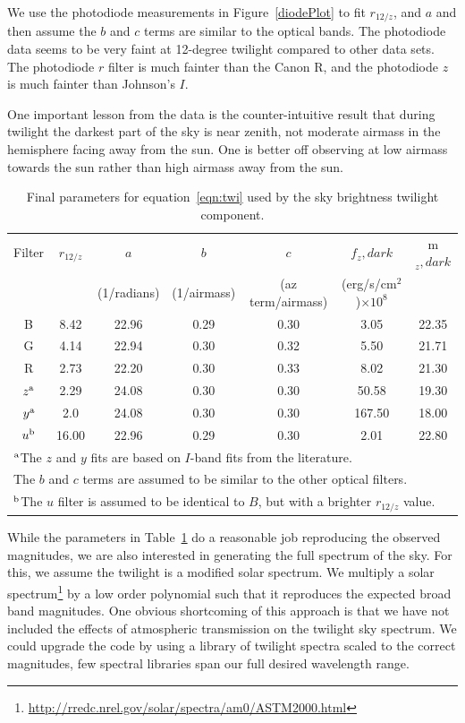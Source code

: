 \documentclass[]{spie}
\begin{document}
We use the photodiode measurements in Figure~\ref{diodePlot} to fit $r_{12/z}$, and $a$ and then assume the $b$ and $c$ terms are similar to the optical bands.  The photodiode data seems to be very faint at 12-degree twilight compared to other data sets.  The photodiode $r$ filter is much fainter than the Canon R, and the photodiode $z$ is much fainter than Johnson's $I$. 

One important lesson from the data is the counter-intuitive result that during twilight the darkest part of the sky is near zenith, not moderate airmass in the hemisphere facing away from the sun. One is better off observing at low airmass towards the sun rather than high airmass away from the sun.

\begin{table}
\caption{Final parameters for equation~\ref{eqn:twi} used by the sky brightness twilight component. 
\label{table:canonFits}}
\begin{tabular}{c c c c c c c}
  Filter & $r_{12/z}$ & $a$  & $b$  & $c$  & $f_z,dark$ & m$_z,dark$ \\
  & & (1/radians) & (1/airmass) & (az term/airmass) & (erg/s/cm$^2$)$\times 10^8$ \\
  B  & 8.42 & 22.96 & 0.29 & 0.30 & 3.05  &  22.35 \\
  G  & 4.14 & 22.94 & 0.30 & 0.32 & 5.50  &  21.71 \\
  R  & 2.73 & 22.20 & 0.30 & 0.33 & 8.02  &  21.30 \\
  \hline
  $z^{\rm{a}}$ & 2.29 & 24.08 & 0.30 & 0.30 & 50.58  &  19.30 \\
  $y^{\rm{a}}$  & 2.0 & 24.08 & 0.30 & 0.30 & 167.50  &  18.00 \\
 \hline 
 $u^{\rm{b}}$  & 16.00 & 22.96 & 0.29 & 0.30 & 2.01  &  22.80\\
 \hline
 \multicolumn{7}{l}{$^{\rm{a}}$The $z$ and $y$ fits are based on $I$-band fits from the literature.} \\
 \multicolumn{7}{l}{The $b$ and $c$ terms are assumed to be similar to the other optical filters.} \\
 \multicolumn{7}{l}{$^{\rm{b}}$The $u$ filter is assumed to be identical to $B$, but with a brighter $r_{12/z}$ value.}
 \end{tabular}
 
\end{table}


While the parameters in Table~\ref{table:canonFits} do a reasonable job reproducing the observed magnitudes, we are also interested in generating the full spectrum of the sky.  For this, we assume the twilight is a modified solar spectrum.  We multiply a solar spectrum\footnote{\url{http://rredc.nrel.gov/solar/spectra/am0/ASTM2000.html}} by a low order polynomial such that it reproduces the expected broad band magnitudes.  One obvious shortcoming of this approach is that we have not included the effects of atmospheric transmission on the twilight sky spectrum. We could upgrade the code by using a library of twilight spectra scaled to the correct magnitudes, few spectral libraries span our full desired wavelength range.
\end{document}
